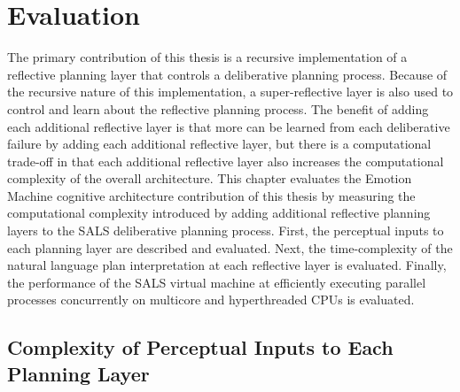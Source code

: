 \chapter{Evaluation}
\label{chapter:evaluation}

The primary contribution of this thesis is a recursive implementation
of a reflective planning layer that controls a deliberative planning
process.  Because of the recursive nature of this implementation, a
super-reflective layer is also used to control and learn about the
reflective planning process.  The benefit of adding each additional
reflective layer is that more can be learned from each deliberative
failure by adding each additional reflective layer, but there is a
computational trade-off in that each additional reflective layer also
increases the computational complexity of the overall architecture.
This chapter evaluates the Emotion Machine cognitive architecture
contribution of this thesis by measuring the computational complexity
introduced by adding additional reflective planning layers to the SALS
deliberative planning process.  First, the perceptual inputs to each
planning layer are described and evaluated.  Next, the time-complexity
of the natural language plan interpretation at each reflective layer
is evaluated.  Finally, the performance of the SALS virtual machine at
efficiently executing parallel processes concurrently on multicore and
hyperthreaded CPUs is evaluated.

\section{Complexity of Perceptual Inputs to Each Planning Layer}

